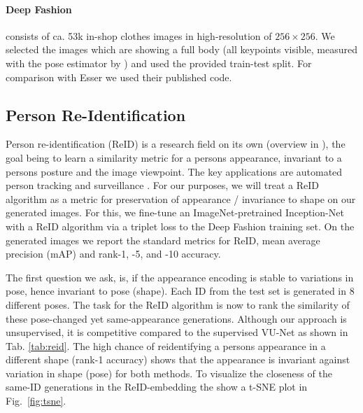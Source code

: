 		\paragraph{Deep Fashion} \cite{liu16deepfashion, liu16deepfashionwild} consists of ca. 53k in-shop clothes images in high-resolution of $256 \times 256$. We selected the images which are showing a full body (all keypoints visible, measured with the pose estimator by \cite{cao17affinityfield}) and used the provided train-test split. For comparison with Esser \etal \cite{esser18} we used their published code. 

	\subsection{Person Re-Identification}

		Person re-identification (ReID) is a research field on its own (overview in \eg \cite{almazan18reidtowards, bedagkar14reidtrends}), the goal being to learn a similarity metric for a persons appearance, invariant to a persons posture and the image viewpoint.
		The key applications are automated person tracking and surveillance \cite{zheng16reidfuture}.
		For our purposes, we will treat a ReID algorithm as a metric for preservation of appearance / invariance to shape on our generated images.
		For this, we fine-tune an ImageNet-pretrained \cite{russakovsky15imagenet} Inception-Net \cite{szegedy15inception} with a ReID algorithm \cite{xiao17reidjoint} via a triplet loss \cite{hermans17reidtriplet} to the Deep Fashion training set.
		On the generated images we report the standard metrics for ReID, mean average precision (mAP) and rank-1, -5, and -10 accuracy.

		The first question we ask, is, if the appearance encoding is stable to variations in pose, hence invariant to pose (shape). Each ID from the test set is generated in 8 different poses. The task for the ReID algorithm is now to rank the similarity of these pose-changed yet same-appearance generations.
		Although our approach is unsupervised, it is competitive compared to the supervised VU-Net \cite{esser18} as shown in Tab. \ref{tab:reid}. The high chance of reidentifying a persons appearance in a different shape (rank-1 accuracy) shows that the appearance is invariant against variation in shape (pose) for both methods.
 		To visualize the closeness of the same-ID generations in the ReID-embedding the show a t-SNE plot in Fig.~\ref{fig:tsne}.


